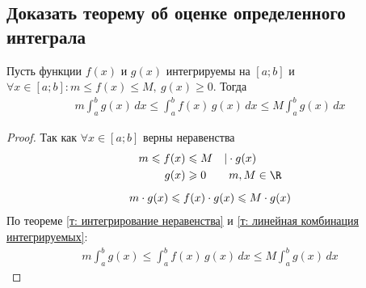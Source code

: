 \subsection{Доказать теорему об оценке определенного интеграла}
\setcounter{theorem}{10}
\begin{theorem}
    Пусть функции $f(x)$ и $g(x)$ интегрируемы на $[a;b]$ и $\forall x \in [a;b]\colon m \leqslant f(x) \leqslant M,\ {g(x) \geqslant 0}$. Тогда
    \begin{gather*}
        \boxed{m \int_{a}^{b} g(x)\, dx \leqslant \int_{a}^{b} f(x)\, g(x)\, dx \leqslant M \int_{a}^{b} g(x)\, dx}
    \end{gather*}
\end{theorem}
\begin{proof}
    Так как $\forall x \in [a;b]$ верны неравенства
    \begin{gather*}
        \begin{aligned}
            m \leqslant f(x) &\leqslant M\quad | \cdot g(x) \\
            g(x) &\geqslant 0\qquad m, M \in \R
        \end{aligned} \\[1ex]
        m\cdot g(x) \leqslant f(x)\cdot g(x) \leqslant M \cdot g(x)
    \end{gather*}
    По теореме \ref{т: интегрирование неравенства} и \ref{т: линейная комбинация интегрируемых}:
    \begin{gather*}
        m \int_{a}^{b} g(x) \leqslant \int_{a}^{b} f(x)\, g(x)\, dx \leqslant M \int_{a}^{b} g(x)\, dx
    \end{gather*}
\end{proof}

